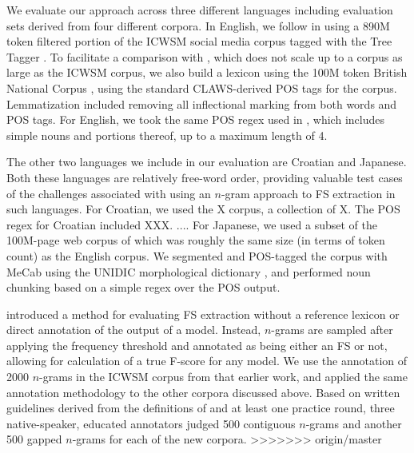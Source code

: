 \documentclass[11pt,letterpaper]{article}
\begin{document}
We evaluate our approach across three different languages including evaluation sets derived from four different corpora. In English, we follow  in using a 890M token filtered portion of the ICWSM social media corpus \cite{ICWSM} tagged with the Tree Tagger \cite{Schmid95}. To facilitate a comparison with , which does not scale up to a corpus as large as the ICWSM corpus, we also build a lexicon using the 100M token British National Corpus \cite{BNC}, using the standard CLAWS-derived POS tags for the corpus. Lemmatization included removing all inflectional marking from both words and POS tags. For English, we took the same POS regex used in , which includes simple nouns and portions thereof, up to a maximum length of 4.

The other two languages we include in our evaluation are Croatian and Japanese. Both these languages are relatively free-word order, providing valuable test cases of the challenges associated with using an $n$-gram approach to FS extraction in such languages. For Croatian, we used the X corpus, a collection of X. The POS regex for Croatian included XXX. .... For Japanese, we used a subset of the 100M-page web corpus of  which was roughly the same size (in terms of token count) as the English corpus. We segmented and POS-tagged the corpus with MeCab \cite{Kudo:2008} using the UNIDIC morphological dictionary \cite{Den:2007}, and performed noun chunking based on a simple regex over the POS output.

 introduced a method for evaluating FS extraction without a reference lexicon or direct annotation of the output of a model. Instead, $n$-grams are sampled after applying the frequency threshold and annotated as being either an FS or not, allowing for calculation of a true F-score for any model. We use the annotation of 2000 $n$-grams in the ICWSM corpus from that earlier work, and applied the same annotation methodology to the other corpora discussed above. Based on written guidelines derived from the definitions of  and at least one practice round, three native-speaker, educated annotators judged 500 contiguous $n$-grams and another 500 gapped $n$-grams for each of the new corpora. 
>>>>>>> origin/master
\end{document}
